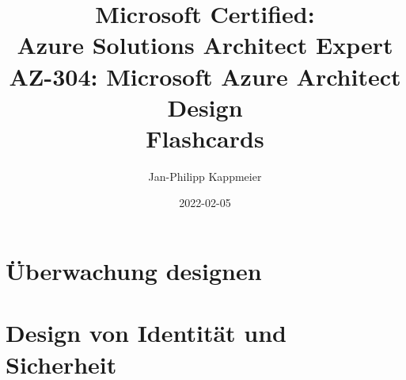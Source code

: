 \documentclass{scrartcl}
\newcommand{\sectioncard}[1]{
    \vspace*{\stretch{1}}
    \section{#1}
    \vspace*{\stretch{1}}
    \pagebreak
}
\begin{document}
    \title{Microsoft Certified:\\Azure Solutions Architect Expert\\\vspace{2mm}AZ-304: Microsoft Azure Architect Design\\Flashcards}
    \date{2022-02-05}
    \author{Jan-Philipp Kappmeier}

    \clearpage\maketitle
    \thispagestyle{empty}
    \pagebreak

    \sectioncard{Überwachung designen}

    
 
    
 
    \sectioncard{Design von Identität und Sicherheit}

    

    

    
    
    

    
    
    \doclicenseThis
    \pagebreak
\end{document}

